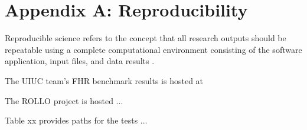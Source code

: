 \chapter*{Appendix A: Reproducibility} 

Reproducible science refers to the concept that all research outputs should be 
repeatable using a complete computational environment consisting of the software 
application, input files, and data results \cite{novak_multiscale_2020}.

The UIUC team's \gls{FHR} benchmark results is hosted at  

The ROLLO project is hosted ... 

Table xx provides paths for the tests ... 